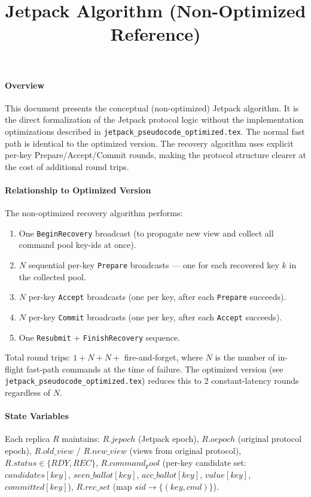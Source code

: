 \documentclass[twocolumn]{article}
\begin{document}
\title{Jetpack Algorithm (Non-Optimized Reference)}
\maketitle

\paragraph{Overview}
This document presents the conceptual (non-optimized) Jetpack algorithm. It is the direct formalization of the Jetpack protocol logic without the implementation optimizations described in \texttt{jetpack\_pseudocode\_optimized.tex}. The normal fast path is identical to the optimized version. The recovery algorithm uses explicit per-key Prepare/Accept/Commit rounds, making the protocol structure clearer at the cost of additional round trips.

\paragraph{Relationship to Optimized Version}
The non-optimized recovery algorithm performs:
\begin{enumerate}
  \setlength{\itemsep}{0pt}
  \item One \texttt{BeginRecovery} broadcast (to propagate new view and collect all command pool key-ids at once).
  \item $N$ sequential per-key \texttt{Prepare} broadcasts — one for each recovered key $k$ in the collected pool.
  \item $N$ per-key \texttt{Accept} broadcasts (one per key, after each \texttt{Prepare} succeeds).
  \item $N$ per-key \texttt{Commit} broadcasts (one per key, after each \texttt{Accept} succeeds).
  \item One \texttt{Resubmit} + \texttt{FinishRecovery} sequence.
\end{enumerate}
Total round trips: $1 + N + N + $ fire-and-forget, where $N$ is the number of in-flight fast-path commands at the time of failure. The optimized version (see \texttt{jetpack\_pseudocode\_optimized.tex}) reduces this to 2 constant-latency rounds regardless of $N$.

\paragraph{State Variables}
Each replica $R$ maintains:
$R.jepoch$ (Jetpack epoch), $R.oepoch$ (original protocol epoch),
$R.old\_view$ / $R.new\_view$ (views from original protocol),
$R.status \in \{RDY, REC\}$,
$R.command_pool$ (per-key candidate set: $candidates[key]$, $seen\_ballot[key]$, $acc\_ballot[key]$, $value[key]$, $committed[key]$),
$R.rec\_set$ (map $sid \to \{(key, cmd)\}$).
\end{document}
